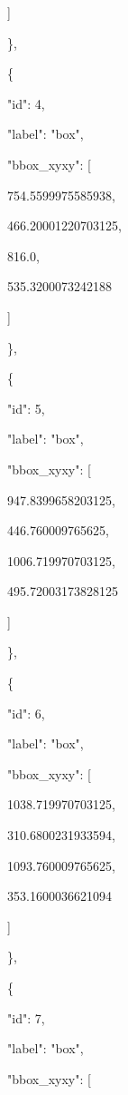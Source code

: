 \documentclass[10pt,a4paper]{article}
\begin{document}
      ]\par
    \},\allowbreak{}\par
    \{\par
      "id":\allowbreak{} 4,\allowbreak{}\par
      "label":\allowbreak{} "box",\allowbreak{}\par
      "bbox\_xyxy":\allowbreak{} [\par
        754.5599975585938,\allowbreak{}\par
        466.20001220703125,\allowbreak{}\par
        816.0,\allowbreak{}\par
        535.3200073242188\par
      ]\par
    \},\allowbreak{}\par
    \{\par
      "id":\allowbreak{} 5,\allowbreak{}\par
      "label":\allowbreak{} "box",\allowbreak{}\par
      "bbox\_xyxy":\allowbreak{} [\par
        947.8399658203125,\allowbreak{}\par
        446.760009765625,\allowbreak{}\par
        1006.719970703125,\allowbreak{}\par
        495.72003173828125\par
      ]\par
    \},\allowbreak{}\par
    \{\par
      "id":\allowbreak{} 6,\allowbreak{}\par
      "label":\allowbreak{} "box",\allowbreak{}\par
      "bbox\_xyxy":\allowbreak{} [\par
        1038.719970703125,\allowbreak{}\par
        310.6800231933594,\allowbreak{}\par
        1093.760009765625,\allowbreak{}\par
        353.1600036621094\par
      ]\par
    \},\allowbreak{}\par
    \{\par
      "id":\allowbreak{} 7,\allowbreak{}\par
      "label":\allowbreak{} "box",\allowbreak{}\par
      "bbox\_xyxy":\allowbreak{} [\par
\end{document}
